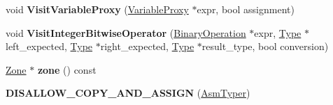 \begin{DoxyCompactItemize}
\item 
void {\bfseries Visit\+Variable\+Proxy} (\hyperlink{classv8_1_1internal_1_1_variable_proxy}{Variable\+Proxy} $\ast$expr, bool assignment)\hypertarget{classv8_1_1internal_1_1_asm_typer_a29b036ab6f839b47eca632d0553fc190}{}\label{classv8_1_1internal_1_1_asm_typer_a29b036ab6f839b47eca632d0553fc190}

\item 
void {\bfseries Visit\+Integer\+Bitwise\+Operator} (\hyperlink{classv8_1_1internal_1_1_binary_operation}{Binary\+Operation} $\ast$expr, \hyperlink{classv8_1_1internal_1_1_type}{Type} $\ast$left\+\_\+expected, \hyperlink{classv8_1_1internal_1_1_type}{Type} $\ast$right\+\_\+expected, \hyperlink{classv8_1_1internal_1_1_type}{Type} $\ast$result\+\_\+type, bool conversion)\hypertarget{classv8_1_1internal_1_1_asm_typer_ada03bba88a816c4e29989844b4540dfb}{}\label{classv8_1_1internal_1_1_asm_typer_ada03bba88a816c4e29989844b4540dfb}

\item 
\hyperlink{classv8_1_1internal_1_1_zone}{Zone} $\ast$ {\bfseries zone} () const \hypertarget{classv8_1_1internal_1_1_asm_typer_ac02239c9c7c95bc9bd1bf8ab5ff5c4ed}{}\label{classv8_1_1internal_1_1_asm_typer_ac02239c9c7c95bc9bd1bf8ab5ff5c4ed}

\item 
{\bfseries D\+I\+S\+A\+L\+L\+O\+W\+\_\+\+C\+O\+P\+Y\+\_\+\+A\+N\+D\+\_\+\+A\+S\+S\+I\+GN} (\hyperlink{classv8_1_1internal_1_1_asm_typer}{Asm\+Typer})\hypertarget{classv8_1_1internal_1_1_asm_typer_a8e34a96933391f8d183ff472e53872ca}{}\label{classv8_1_1internal_1_1_asm_typer_a8e34a96933391f8d183ff472e53872ca}

\end{DoxyCompactItemize}
